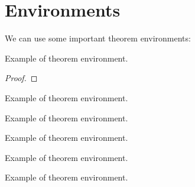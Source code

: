 \documentclass[twoside,openany,12pt]{beautynote}
\begin{document}
\section{Environments}
We can use some important theorem environments:
\begin{theorem}[Theorem]\label{thm:example-1}
    Example of theorem environment.
\end{theorem}
\begin{proof}
    
\end{proof}
    
\begin{lemma}[Lemma]\label{thm:example-2}
    Example of theorem environment.
\end{lemma}
\begin{solution}
    
\end{solution}
    
\begin{definition}[Definition]\label{thm:example-3}
    Example of theorem environment.
\end{definition}
\begin{proposition}[Proposition]\label{thm:example-4}
    Example of theorem environment.
\end{proposition}
\begin{problem}[Problem]\label{thm:example-5}
    Example of theorem environment.
\end{problem}
\begin{remark}[Remark]
    Example of theorem environment.
\end{remark}

\clearpage
\pagestyle{\auxsettings}
\printbibliography[heading=bibintoc]
\end{document}
